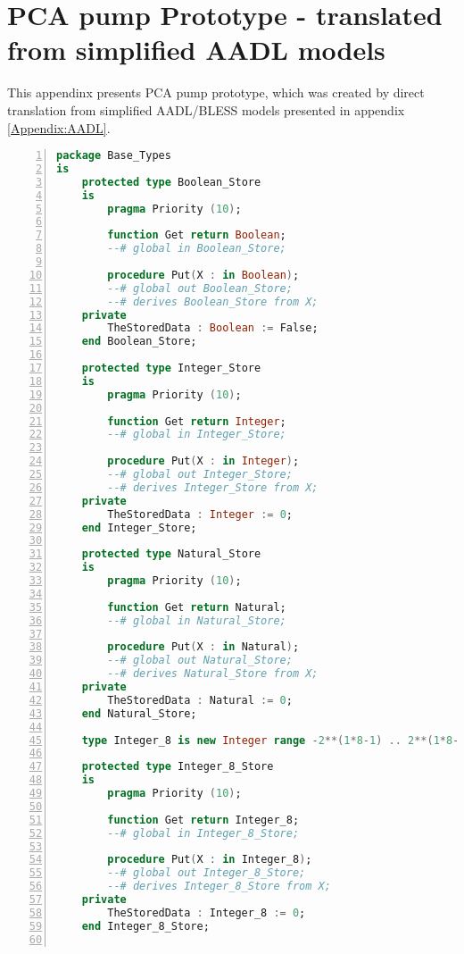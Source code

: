
\cleardoublepage

\chapter{PCA pump Prototype - translated from simplified AADL models}
\label{Appendix:pca_generated}

This appendinx presents PCA pump prototype, which was created by direct translation from simplified AADL/BLESS models presented in appendix \ref{Appendix:AADL}.

\singlespacing
\begin{lstlisting}[language=ada, gobble=0, numbers=left, caption={\lstinline{Base_Types} package}, label={listing:pca_generated:base_types}]
package Base_Types
is
    protected type Boolean_Store
    is
        pragma Priority (10);

        function Get return Boolean;
        --# global in Boolean_Store;

        procedure Put(X : in Boolean);
        --# global out Boolean_Store;
        --# derives Boolean_Store from X;
    private
        TheStoredData : Boolean := False;
    end Boolean_Store;

    protected type Integer_Store
    is
        pragma Priority (10);

        function Get return Integer;
        --# global in Integer_Store;

        procedure Put(X : in Integer);
        --# global out Integer_Store;
        --# derives Integer_Store from X;
    private
        TheStoredData : Integer := 0;
    end Integer_Store;

    protected type Natural_Store
    is
        pragma Priority (10);

        function Get return Natural;
        --# global in Natural_Store;

        procedure Put(X : in Natural);
        --# global out Natural_Store;
        --# derives Natural_Store from X;
    private
        TheStoredData : Natural := 0;
    end Natural_Store;

    type Integer_8 is new Integer range -2**(1*8-1) .. 2**(1*8-1)-1;

    protected type Integer_8_Store
    is
        pragma Priority (10);

        function Get return Integer_8;
        --# global in Integer_8_Store;

        procedure Put(X : in Integer_8);
        --# global out Integer_8_Store;
        --# derives Integer_8_Store from X;
    private
        TheStoredData : Integer_8 := 0;
    end Integer_8_Store;


\end{lstlisting}
